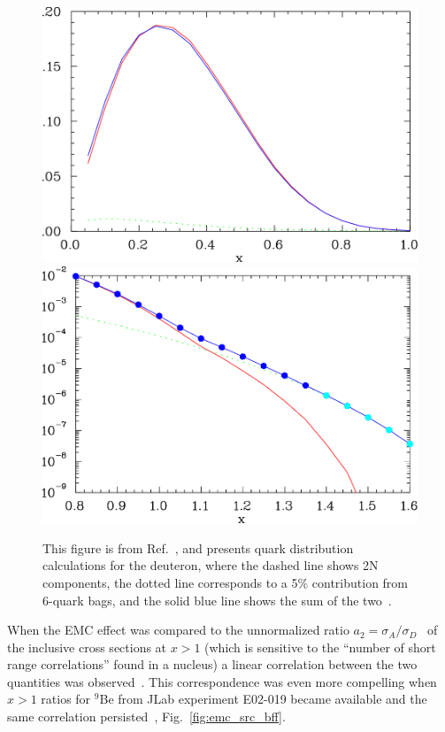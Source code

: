 \begin{figure}[tbp]
\includegraphics[width=1.0\columnwidth]{plots/qofx2_lin_5per} \hfill
\includegraphics[width=1.0\columnwidth]{plots/qofx2_log_5per}
\caption{This figure is from Ref.~\cite{Arrington:2003qt}, and presents quark distribution calculations for the deuteron, where the dashed line shows 2N components, the dotted line corresponds to a 5\% contribution from 6-quark bags, and the solid blue line shows the sum of the two~\cite{Mulders:1983au}. }
\label{fig:quarkbags}
\end{figure}

When the EMC effect was compared to the unnormalized ratio $a_2=\sigma_A/\sigma_D$~\cite{Frankfurt:1993sp} of the
inclusive cross sections at $x>1$ (which is sensitive to the ``number of short range correlations''
found in a nucleus) a linear correlation between the two quantities was observed~\cite{Weinstein:2010rt}.
This correspondence was even more compelling when $x>1$ ratios for $^9$Be from JLab experiment E02-019 became
available and the same correlation persisted~\cite{Arrington:2012ax, Hen:2012fm}, Fig.~\ref{fig:emc_src_bff}.

